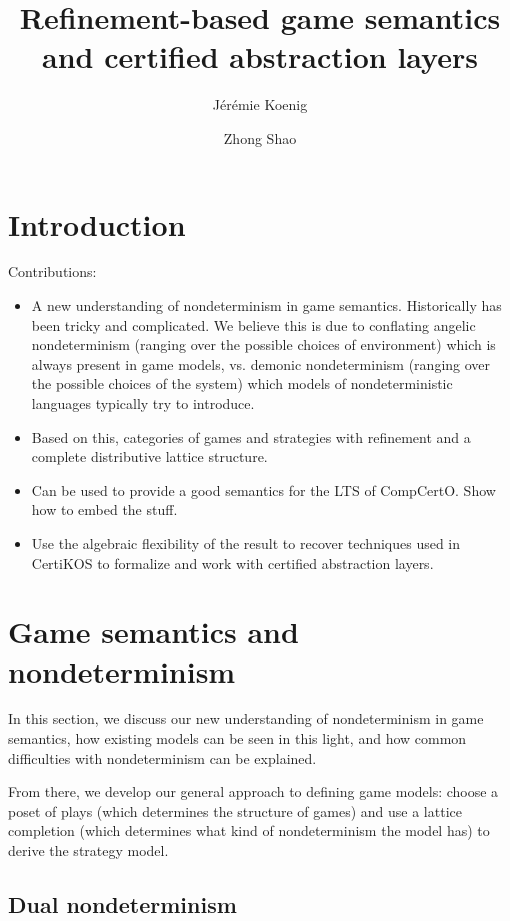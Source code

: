 \documentclass[format=sigplan,authordraft]{acmart}
\title{Refinement-based game semantics and certified abstraction layers} %
\author{J\'er\'emie Koenig}
\affiliation{Yale University}
\author{Zhong Shao}
\affiliation{Yale University}
\begin{document}
\maketitle

\section{Introduction} %

Contributions:
\begin{itemize}
\item A new understanding of nondeterminism in game semantics.
  Historically has been tricky and complicated.
  We believe this is due to conflating
  angelic nondeterminism
  (ranging over the possible choices of environment)
  which is always present in game models,
  vs. demonic nondeterminism
  (ranging over the possible choices of the system)
  which models of nondeterministic languages
  typically try to introduce.
\item Based on this,
  categories of games and strategies
  with refinement and a complete distributive lattice structure.
\item Can be used to provide a good semantics
  for the LTS of CompCertO.
  Show how to embed the stuff.
\item Use the algebraic flexibility of the result
  to recover techniques used in CertiKOS
  to formalize and work with
  certified abstraction layers.
\end{itemize}


\section{Game semantics and nondeterminism} %

In this section,
we discuss our new understanding of
nondeterminism in game semantics,
how existing models can be seen in this light,
and how common difficulties
with nondeterminism can be explained.

From there,
we develop our general approach
to defining game models:
choose a poset of plays
(which determines the structure of games)
and use a lattice completion
(which determines what kind of nondeterminism
the model has)
to derive the strategy model.

\subsection{Dual nondeterminism} \label{sec:refcal} %
\end{document}
